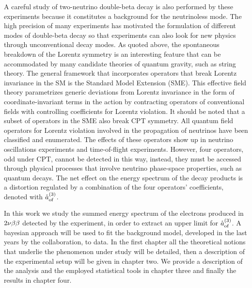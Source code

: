 	A careful study of two-neutrino double-beta decay is also performed by these experiments because it constitutes a background for the neutrinoless mode. The high precision of many experiments has motivated the formulation of different modes of double-beta decay so that experiments can also look for new physics through unconventional decay modes. As quoted above, the spontaneous breakdown of the Lorentz symmetry is an interesting feature that can be accommodated by many candidate theories of quantum gravity, such as string theory. The general framework that incorporates operators that break Lorentz invariance in the SM is the Standard Model Extension (SME). This effective field theory parametrizes generic deviations from Lorentz invariance in the form of coordinate-invariant terms in the action by contracting operators of conventional fields with controlling coefficients for Lorentz violation. It should be noted that a subset of operators in the SME also break CPT symmetry. All quantum field operators for Lorentz violation involved in the propagation of neutrinos have been classified and enumerated. The effects of these operators show up in neutrino oscillations experiments and time-of-flight experiments. However, four operators, odd under CPT, cannot be detected in this way, instead, they must be accessed through physical processes that involve neutrino phase-space properties, such as quantum decays. The net effect on the energy spectrum of the decay products is a distortion regulated by a combination of the four operators' coefficients, denoted with $\mathring{a}_\text{of}^{(3)}$.

	In this work we study the summed energy spectrum of the electrons produced in $2\nu\beta\beta$ detected by the {\gerda} experiment, in order to extract an upper limit for $\mathring{a}_\text{of}^{(3)}$. A bayesian approach will be used to fit the background model, developed in the last years by the {\gerda} collaboration, to data. In the first chapter all the theoretical notions that underlie the phenomenon under study will be detailed, then a description of the experimental setup will be given in chapter two. We provide a description of the analysis and the employed statistical tools in chapter three and finally the results in chapter four.
